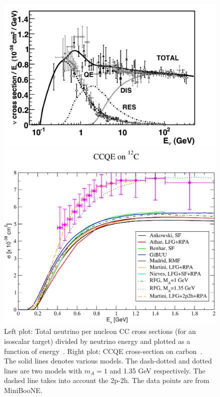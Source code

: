 \begin{figure}[htbp]
\begin{minipage}[c]{.46\linewidth}
   	      \includegraphics[width=0.9\linewidth]{figures/cc_inclusive_nu.pdf}
   \end{minipage} \hfill
   \begin{minipage}{.46\linewidth}
      \includegraphics[width=0.9\linewidth]{figures/CCQE_C_2.pdf}
   \end{minipage}
    \caption{ Left plot: Total neutrino per nucleon CC cross sections (for an isoscalar target) divided by neutrino energy and
plotted as a function of energy~\cite{formaggio}.
Right plot: CCQE cross-section on carbon~\cite{alvarez}.
The solid
lines denotes various models.  The dash-dotted and
dotted lines are two models with $m_A=1$ and 1.35 GeV respectively. 
The dashed line takes into account the 2p-2h.  The data points
are from MiniBooNE.}
 \label{fig:xsec}
\end{figure}

